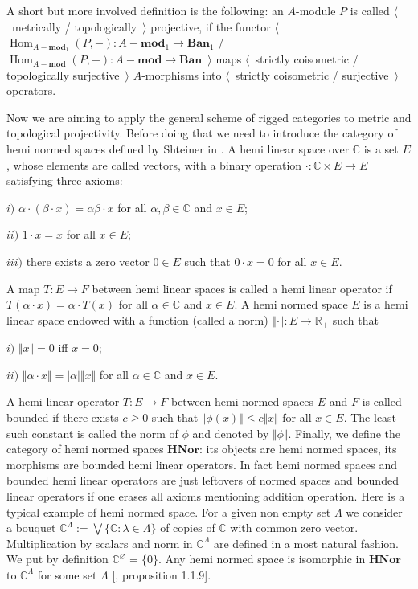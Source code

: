 A short but more involved definition is the following: an $A$-module $P$ is called $\langle$~metrically / topologically~$\rangle$ projective, if the functor $\langle$~$\operatorname{Hom}_{A-\mathbf{mod}_1}(P,-):A-\mathbf{mod}_1\to\mathbf{Ban}_1$ / $\operatorname{Hom}_{A-\mathbf{mod}}(P,-):A-\mathbf{mod}\to\mathbf{Ban}$~$\rangle$ maps $\langle$~strictly coisometric / topologically surjective~$\rangle$ $A$-morphisms into $\langle$~strictly coisometric / surjective~$\rangle$ operators.

Now we are aiming to apply the general scheme of rigged categories to metric and topological projectivity. Before doing that we need to introduce the category of hemi normed spaces defined by Shteiner in \cite{ShtTopFrClassicQuantMod}. A hemi linear space over $\mathbb{C}$ is a set $E$, whose elements are called vectors, with a binary operation $\cdot:\mathbb{C}\times E\to E$ satisfying three axioms:

$i)$ $\alpha\cdot(\beta\cdot x)=\alpha\beta\cdot x$ for all $\alpha,\beta\in\mathbb{C}$ and $x\in E$; 

$ii)$ $1\cdot x=x$ for all $x\in E$; 

$iii)$ there exists a zero vector $0\in E$ such that $0\cdot x=0$ for all $x\in E$. 

A map $T:E\to F$ between hemi linear spaces is called a hemi linear operator if $T(\alpha\cdot x)=\alpha\cdot T(x)$ for all $\alpha\in\mathbb{C}$ and $x\in E$. A hemi normed space $E$ is a hemi linear space endowed with a function (called a norm) $\Vert\cdot\Vert:E\to\mathbb{R}_+$ such that

$i)$ $\Vert x\Vert=0$ iff $x=0$;

$ii)$ $\Vert\alpha\cdot x\Vert=|\alpha|\Vert x\Vert$ for all $\alpha\in\mathbb{C}$ and $x\in E$. 

A hemi linear operator $T:E\to F$ between hemi normed spaces $E$ and $F$ is called bounded if there exists $c\geq 0$ such that $\Vert\phi(x)\Vert\leq c\Vert x\Vert$ for all $x\in E$. The least such constant is called the norm of $\phi$ and denoted by $\Vert \phi\Vert$. Finally, we define the category of hemi normed spaces $\mathbf{HNor}$: its objects are hemi normed spaces, its morphisms are bounded hemi linear operators. In fact hemi normed spaces and bounded hemi linear operators are just leftovers of normed spaces and bounded linear operators if one erases  all axioms mentioning addition operation. Here is a typical example of hemi normed space. For a given non empty set $\Lambda$ we consider a bouquet $\mathbb{C}^\Lambda:=\bigvee \{\mathbb{C}:\lambda\in\Lambda\}$ of copies of $\mathbb{C}$ with common zero vector. Multiplication by scalars and norm in $\mathbb{C}^\Lambda$ are defined in a most natural fashion. We put by definition $\mathbb{C}^\varnothing=\{0\}$. Any hemi normed space is isomorphic in $\mathbf{HNor}$ to $\mathbb{C}^\Lambda$ for some set $\Lambda$ [\cite{ShtTopFrClassicQuantMod}, proposition 1.1.9].

